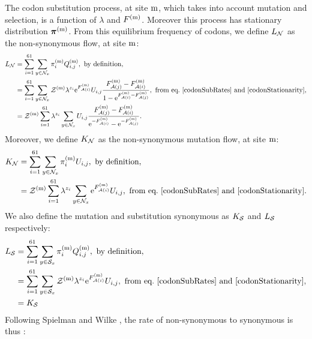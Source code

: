 The \gls{codon} \gls{substitution} process, at site $\text{m}$, which takes into account mutation and selection, is a function of $\lambda$ and $F^{(\text{m})}$.
Moreover this process has stationary distribution $\bm{\pi}^{(\text{m})}$.
From this equilibrium frequency of \glspl{codon}, we define $L_{\mathcal{N}}$ as the \gls{non-synonymous} flow, at site $\text{m}$:
\begin{align}
    L_{\NonSyn}
    & = \sum\limits_{\ci=1}^{61} \sum\limits_{y \in \NxNonSyn}  \subequi_{\ci}\siteexp \submatrix_{\itoj}\siteexp, \ \textrm{by definition},\\
    & = \sum\limits_{\ci=1}^{61} \sum\limits_{y \in \NxNonSyn} \mathcal{Z}\siteexp \lambda^{\nbrWeak_{\ci}} \e^{\Fiti\siteexp} U_{\itoj} \dfrac{\Fitj\siteexp - \Fiti\siteexp}{1 - \e^{\Fiti\siteexp - \Fitj\siteexp}}, \ \textrm{from eq.}\ \ref{codonSubRates} \ \text{and} \ \ref{codonStationarity},\\
    & = \mathcal{Z}\siteexp \sum\limits_{\ci=1}^{61} \lambda^{\nbrWeak_{\ci}} \sum\limits_{y \in \NxNonSyn}  U_{\itoj} \dfrac{\Fitj\siteexp - \Fiti\siteexp}{\e^{-\Fiti\siteexp} - \e^{ - \Fitj\siteexp}}.
    \label{subFlowNonSyn}
\end{align}
Moreover, we define $K_{\mathcal{N}}$ as the non-synonymous mutation flow, at site $\text{m}$:
\begin{align}
    K_{\NonSyn}
    & = \sum\limits_{\ci=1}^{61} \sum\limits_{y \in \NxNonSyn}  \subequi_{\ci}\siteexp U_{\itoj}, \ \textrm{by definition},\\
    & = \mathcal{Z}\siteexp  \sum\limits_{\ci=1}^{61} \lambda^{\nbrWeak_{\ci}} \sum\limits_{y \in \NxNonSyn} \e^{\Fiti\siteexp} U_{\itoj}, \ \textrm{from eq.}\ \ref{codonSubRates} \ \text{and} \ \ref{codonStationarity}.
    \label{mutFlowNonSyn}
\end{align}
We also define the mutation and \gls{substitution} synonymous as $K_{\mathcal{S}}$ and $L_{\mathcal{S}}$ respectively:
\begin{align}
    L_{\Syn}
    & =  \sum\limits_{\ci=1}^{61} \sum\limits_{y \in \NxSyn}  \subequi_{\ci}\siteexp \submatrix_{\itoj}\siteexp, \ \textrm{by definition},\\
    & = \sum\limits_{\ci=1}^{61} \sum\limits_{y \in \NxSyn} \mathcal{Z}\siteexp \lambda^{\nbrWeak_{\ci}} \e^{\Fiti\siteexp} U_{\itoj}, \ \textrm{from eq.}\ \ref{codonSubRates} \ \text{and} \ \ref{codonStationarity}, \\
    & = K_{\Syn}
    \label{subFlowSyn}
\end{align}
Following Spielman and Wilke \citep{Spielman2015}, the rate of non-synonymous to \gls{synonymous} is thus :
